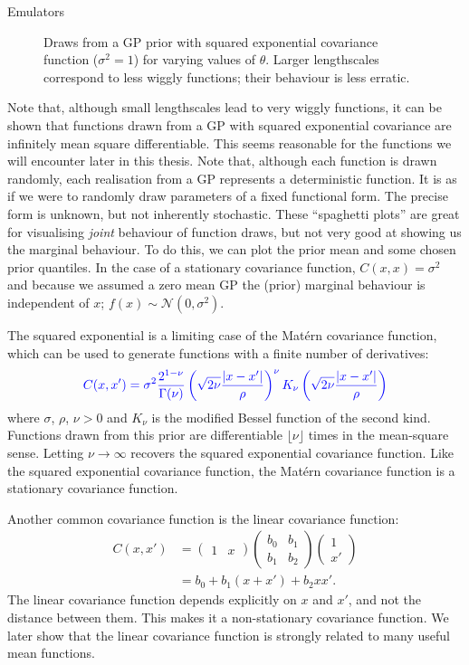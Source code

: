 \begin{chapter}{Emulators \label{Ch:Emulators}}
\begin{figure}[h]
  \caption{Draws from a GP prior with squared exponential covariance function ($\sigma^2 = 1$) for varying values of $\theta$. Larger lengthscales correspond to less wiggly functions; their behaviour is less erratic.}
  \label{Fig:random-funcs}
\end{figure}
Note that, although small lengthscales lead to very wiggly functions, it can be shown that functions drawn from a GP with squared exponential covariance are infinitely mean square differentiable. This seems reasonable for the functions we will encounter later in this thesis. Note that, although each function is drawn randomly, each realisation from a GP represents a deterministic function. It is as if we were to randomly draw parameters of a fixed functional form. The precise form is unknown, but not inherently stochastic. These ``spaghetti plots'' are great for visualising \textit{joint} behaviour of function draws, but not very good at showing us the marginal behaviour. To do this, we can plot the prior mean and some chosen prior quantiles. In the case of a stationary covariance function, $C(x, x) = \sigma^2$ and because we assumed a zero mean GP the (prior) marginal behaviour is independent of $x$; $f(x) \sim  \mathcal{N}(0, \sigma^2)$.

The squared exponential is a limiting case of the Mat\'ern covariance function, which can be used to generate functions with a finite number of derivatives:
\begin{equation}
\textcolor{blue}{  C(x, x') = \sigma^2 \frac{2^{1-\nu}}{\Gamma(\nu)} \left( \sqrt{2\nu}\frac{|x - x'|}{\rho} \right)^\nu K_\nu\left(\sqrt{2\nu}\frac{|x - x'|}{\rho} \right)}
\end{equation}
where $\sigma$, $\rho$, $\nu > 0$ and $K_\nu$ is the modified Bessel function of the second kind. Functions drawn from this prior are differentiable $\lfloor \nu \rfloor$ times in the mean-square sense. Letting $\nu \to \infty$ recovers the squared exponential covariance function. Like the squared exponential covariance function, the Mat\'ern covariance function is a stationary covariance function.

Another common covariance function is the linear covariance function:
\begin{align}
  C(x, x') &= \begin{pmatrix}
    1&x
\end{pmatrix}
\begin{pmatrix}
  b_0 & b_1 \\
  b_1 & b_2
\end{pmatrix}
\begin{pmatrix}
  1 \\ x'
\end{pmatrix} \\ \nonumber
  &= b_{0} + b_{1}(x + x') + b_2 x x'.
\end{align}
The linear covariance function depends explicitly on $x$ and $x'$, and not the distance between them. This makes it a non-stationary covariance function. We later show that the linear covariance function is strongly related to many useful mean functions.


\end{chapter}
